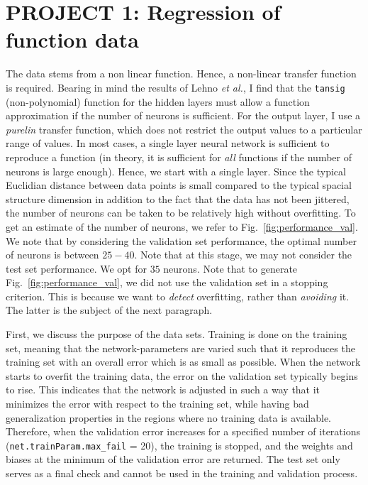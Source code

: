 \documentclass[pdftex,11pt,a4paper]{article}
\begin{document}
\section{PROJECT 1: Regression of function data}\label{sec:regression}
The data stems from a non linear function. Hence, a non-linear transfer function is required. Bearing in mind the results of Lehno \textit{et al.}, I find that the \texttt{tansig} (non-polynomial) function for the hidden layers must allow a function approximation if the number of neurons is sufficient. For the output layer, I use a \textit{purelin} transfer function, which does not restrict the output values to a particular range of values. In most cases, a single layer neural network is sufficient to reproduce a function (in theory, it is sufficient for \textit{all} functions if the number of neurons is large enough). Hence, we start with a single layer. Since the typical Euclidian distance between data points is small compared to the typical spacial structure dimension in addition to the fact that the data has not been jittered, the number of neurons can be taken to be relatively high without overfitting. To get an estimate of the number of neurons, we refer to Fig.~\ref{fig:performance_val}. We note that by considering the validation set performance, the optimal number of neurons is between $25 - 40$. Note that at this stage, we may not consider the test set performance. We opt for $35$ neurons. Note that to generate Fig.~\ref{fig:performance_val}, we did not use the validation set in a stopping criterion. This is because we want to \textit{detect} overfitting, rather than \textit{avoiding} it. The latter is the subject of the next paragraph.

First, we discuss the purpose of the data sets. Training is done on the training set, meaning that the network-parameters are varied such that it reproduces the training set with an overall error which is as small as possible. When the network starts to overfit the training data, the error on the validation set typically begins to rise. This indicates that the network is adjusted in such a way that it minimizes the error with respect to the training set, while having bad generalization properties in the regions where no training data is available. Therefore, when the validation error increases for a specified number of iterations (\texttt{net.trainParam.max\_fail} = 20), the training is stopped, and the weights and biases at the minimum of the validation error are returned. The test set only serves as a final check and cannot be used in the training and validation process.
\end{document}
